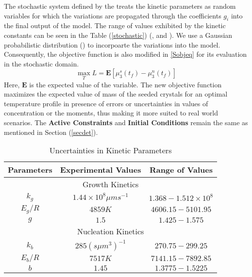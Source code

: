 \documentclass[3p,times,authoryear]{elsarticle}
\begin{document}
The stochastic system defined by the  treats the kinetic parameters as random variables for which the variations are propagated through the coefficients $g_{i}$ into the final output of the model. The range of values exhibited by the kinetic constants can be seen in the Table (\ref{stochastic}) (\cite{hu}, \cite{shi} and \cite{paeng}). We use a Gaussian probabilistic distribution (\cite{yenkie}) to incorpoarte the variations into the model. Consequently, the objective function is also modified in \ref{Sobjeq} for its evaluation in the stochastic domain.   
\begin{equation} 
\max_{T} L = \mathbf{E}\left[ \mu_{3}^{s}(t_{f}) - \mu_{3}^{n}(t_{f})\right] \label{Sobjeq}
\end{equation}
Here, $\mathbf{E}$ is the expected value of the variable. The new objective function
maximizes the expected value of mass of the seeded crystals for an optimal temperature profile in presence of errors or uncertainties in values of concentration or the moments, thus making it more suited to real world scenarios. The \textbf{Active Constraints} and \textbf{Initial Conditions} remain the same as mentioned in Section (\ref{secdet}).

\begin{center}
\begin{table}[!h]
\centering
\caption{Uncertainties in Kinetic Parameters}  \label{stochastic}
\begin{tabular}{|c|c|c|} 
\hline
Parameters & Experimental Values & Range of Values\\
\hline
\multicolumn{3}{|c|}{Growth Kinetics} \\
\hline
$k_{g}$ & $1.44\times10^{8} \mu m s^{-1}$ & $1.368 - 1.512\times10^{8} $\\
$E_{g}/R$ & $4859K$ & $4606.15-5101.95$\\
$g$ & $1.5$ & $1.425-1.575$\\
\hline
\multicolumn{3}{|c|}{Nucleation Kinetics} \\
\hline
$k_{b}$ & $285 (s \mu m^{3})^{-1}$ & $270.75-299.25$\\ 
$E_{b}/R$ & $7517K$ & $7141.15-7892.85$\\
$b$ & $1.45$ & $1.3775-1.5225$\\
\hline
\end{tabular}

\label{Table3}
\end{table}
\end{center}
\end{document}
